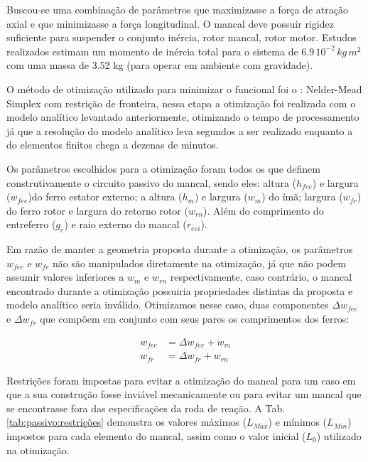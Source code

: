 Buscou-se uma combinação de parâmetros que maximizasse a força de atração axial e que minimizasse a força longitudinal. O mancal deve possuir rigidez suficiente para suspender o conjunto inércia, rotor mancal, rotor motor. Estudos realizados estimam um momento de inércia total para o sistema de $6.9 \, 10^{-2} \, kg \, m^2$ com uma massa de 3.52 kg (para operar em ambiente com gravidade). 

O método de otimização utilizado para minimizar o funcional foi o :  Nelder-Mead Simplex com restrição de fronteira,  nessa etapa a otimização foi realizada com o modelo analítico levantado anteriormente, otimizando o tempo de processamento já que a resolução do modelo analítico leva segundos a ser realizado enquanto a do elementos finitos chega a dezenas de minutos.

Os parâmetros escolhidos para a otimização foram todos os que definem construtivamente o circuito passivo do mancal, sendo eles: altura  ($h_{fee}$) e largura  ($w_{fee}$)do ferro estator externo; a altura ($h_m$) e largura ($w_m$) do ímã;  largura ($w_{fr}$) do ferro rotor e largura do retorno rotor ($w_{rn}$). Além do comprimento do entreferro ($g_e$) e raio externo do mancal ($r_{eei}$).

Em razão de manter a geometria proposta durante a otimização, os parâmetros $w_{fee}$ e $w_{fr}$ não são manipulados diretamente na otimização, já que não podem assumir valores inferiores a $w_m$ e $w_{rn}$ respectivamente, caso contrário, o mancal encontrado durante a otimização possuiria propriedades distintas da proposta e modelo analítico seria inválido. Otimizamos nesse caso, duas componentes $\Delta w_{fee}$ e $\Delta w_{fr}$ que compõem em conjunto com seus pares os comprimentos dos ferros:

\begin{align}
w_{fee}  &= \Delta w_{fee} + w_m \\
w_{fr} &= \Delta w_{fr} + w_{rn}
\end{align}	

Restrições foram impostas para evitar a otimização do mancal para um caso em que a sua construção fosse inviável mecanicamente ou para evitar um mancal que se encontrasse fora das especificações da roda de reação. A Tab. \ref{tab:passivo:restrições} demonstra os valores máximos ($L_{Max}$) e mínimos ($L_{Min}$) impostos para cada elemento do mancal, assim como o valor inicial ($L_0$) utilizado na otimização.


